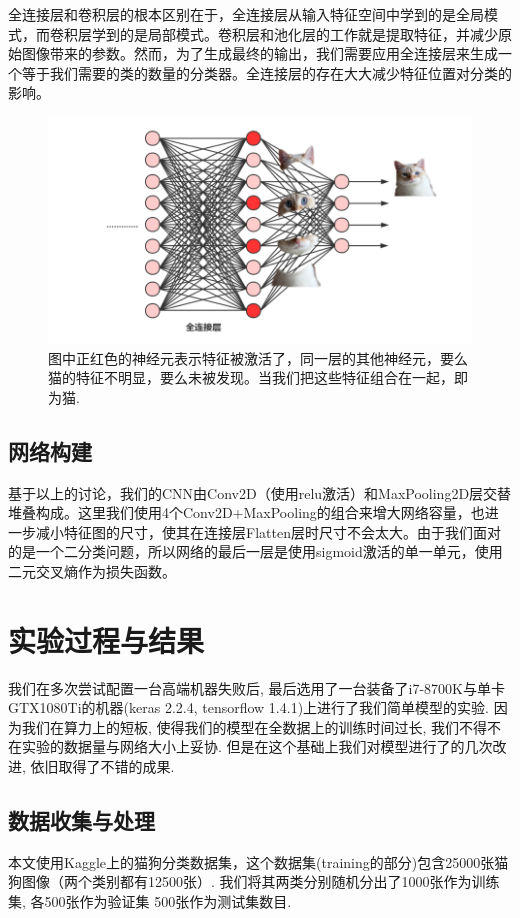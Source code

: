\documentclass[lang=cn,11pt]{elegantpaper}
\begin{document}
全连接层和卷积层的根本区别在于，全连接层从输入特征空间中学到的是全局模式，而卷积层学到的是局部模式。卷积层和池化层的工作就是提取特征，并减少原始图像带来的参数。然而，为了生成最终的输出，我们需要应用全连接层来生成一个等于我们需要的类的数量的分类器。全连接层的存在大大减少特征位置对分类的影响。
\begin{figure}[hbtp]
\centering
  \includegraphics{densecat.png}
  \caption{图中正红色的神经元表示特征被激活了，同一层的其他神经元，要么猫的特征不明显，要么未被发现。当我们把这些特征组合在一起，即为猫. \label{fig:densecat1}}
\end{figure}


\subsection{网络构建}
基于以上的讨论，我们的CNN由Conv2D（使用relu激活）和MaxPooling2D层交替堆叠构成。这里我们使用4个Conv2D+MaxPooling的组合来增大网络容量，也进一步减小特征图的尺寸，使其在连接层Flatten层时尺寸不会太大。由于我们面对的是一个二分类问题，所以网络的最后一层是使用sigmoid激活的单一单元，使用二元交叉熵作为损失函数。


\section{实验过程与结果}

我们在多次尝试配置一台高端机器失败后, 最后选用了一台装备了i7-8700K与单卡GTX1080Ti的机器(keras 2.2.4, tensorflow 1.4.1)上进行了我们简单模型的实验. 因为我们在算力上的短板, 使得我们的模型在全数据上的训练时间过长, 我们不得不在实验的数据量与网络大小上妥协. 但是在这个基础上我们对模型进行了的几次改进, 依旧取得了不错的成果.

\subsection{数据收集与处理}
本文使用Kaggle上的猫狗分类数据集，这个数据集(training的部分)包含25000张猫狗图像（两个类别都有12500张）. 我们将其两类分别随机分出了1000张作为训练集, 各500张作为验证集 500张作为测试集数目.
\end{document}
